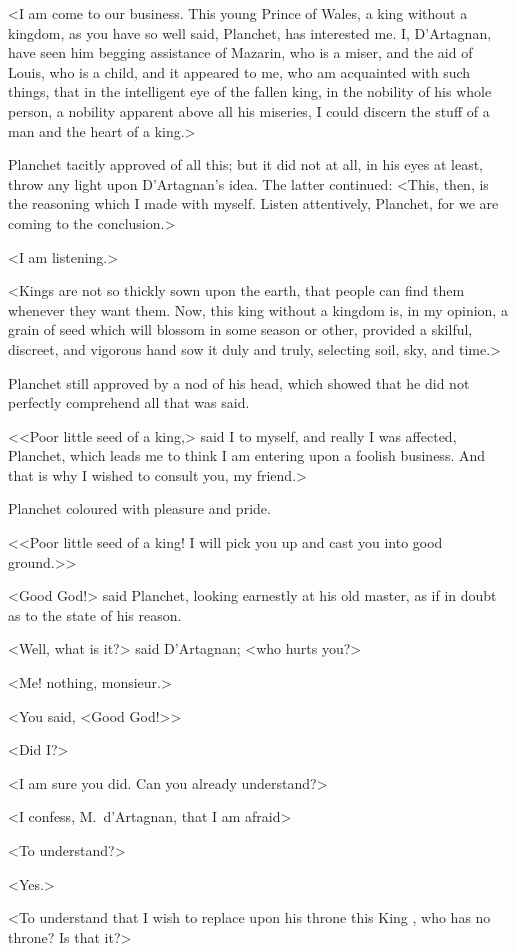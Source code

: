 <I am come to our business. This young Prince of Wales, a king without a kingdom, as you have so well said, Planchet, has interested me. I, D'Artagnan, have seen him begging assistance of Mazarin, who is a miser, and the aid of Louis, who is a child, and it appeared to me, who am acquainted with such things, that in the intelligent eye of the fallen king, in the nobility of his whole person, a nobility apparent above all his miseries, I could discern the stuff of a man and the heart of a king.>

Planchet tacitly approved of all this; but it did not at all, in his eyes at least, throw any light upon D'Artagnan's idea. The latter continued: <This, then, is the reasoning which I made with myself. Listen attentively, Planchet, for we are coming to the conclusion.>

<I am listening.>

<Kings are not so thickly sown upon the earth, that people can find them whenever they want them. Now, this king without a kingdom is, in my opinion, a grain of seed which will blossom in some season or other, provided a skilful, discreet, and vigorous hand sow it duly and truly, selecting soil, sky, and time.>

Planchet still approved by a nod of his head, which showed that he did not perfectly comprehend all that was said.

<<Poor little seed of a king,> said I to myself, and really I was affected, Planchet, which leads me to think I am entering upon a foolish business. And that is why I wished to consult you, my friend.>

Planchet coloured with pleasure and pride.

<<Poor little seed of a king! I will pick you up and cast you into good ground.>>

<Good God!> said Planchet, looking earnestly at his old master, as if in doubt as to the state of his reason.

<Well, what is it?> said D'Artagnan; <who hurts you?>

<Me! nothing, monsieur.>

<You said, <Good God!>>

<Did I\@?>

<I am sure you did. Can you already understand?>

<I confess, M.~d'Artagnan, that I am afraid\longdash>

<To understand?>

<Yes.>

<To understand that I wish to replace upon his throne this King , who has no throne? Is that it?>


